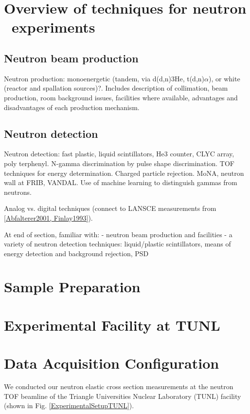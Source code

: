 \section{Overview of techniques for neutron \el\ experiments}
\subsection{Neutron beam production}
Neutron production: monoenergetic (tandem, via d(d,n)3He, t(d,n)$\alpha$),
or white (reactor and spallation sources)?. Includes description of
collimation, beam production, room background issues, facilities where
available, advantages and disadvantages of each production mechanism.

\subsection{Neutron detection}
Neutron detection: fast plastic, liquid scintillators, He3 counter, CLYC array, poly
terphenyl. N-gamma discrimination by pulse shape discrimination. TOF techniques
for energy determination. Charged particle rejection. MoNA, neutron wall at
FRIB, VANDAL. Use of machine learning to distinguish gammas from neutrons.

Analog vs. digital techniques (connect to LANSCE measurements from \ref{Abfalterer2001, Finlay1993}).

At end of section, familiar with:
- neutron beam production and facilities
- a variety of neutron detection techniques: liquid/plastic scintillators,
means of energy detection and background rejection, PSD


\section{Sample Preparation}
\section{Experimental Facility at TUNL}
\section{Data Acquisition Configuration}

We conducted our neutron elastic cross section measurements at the neutron TOF
beamline of the Triangle Universities Nuclear Laboratory (TUNL) facility
(shown in Fig. \ref{ExperimentalSetupTUNL}).

